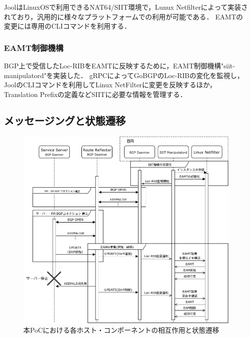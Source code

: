 JoolはLinuxOSで利用できるNAT64/SIIT環境で，Lunux Netfilterによって実装されており，汎用的に様々なプラットフォームでの利用が可能である\cite{JOOL,quintero2016performance}．
EAMTの変更には専用のCLIコマンドを利用する．

\subsubsection{EAMT制御機構}
\label{implementation:poc:siit-manipulatord}
BGP上で受信したLoc-RIBをEAMTに反映するために，EAMT制御機構"siit-manipulatord"を実装した．
gRPCによってGoBGPのLoc-RIBの変化を監視し，JoolのCLIコマンドを利用してLinux NetFilterに変更を反映するほか，Translation Prefixの定義などSIITに必要な情報を管理する．

\subsection{メッセージングと状態遷移}
\label{implementation:poc:sequence}

\begin{figure}[H]
    \begin{center}
    \includegraphics[width=15cm,pagebox=cropbox,clip]{img/sequence_manipulatord.pdf}
    \end{center}
    \caption{本PoCにおける各ホスト・コンポーネントの相互作用と状態遷移}
    \label{fig:poc_implementation}
\end{figure}

